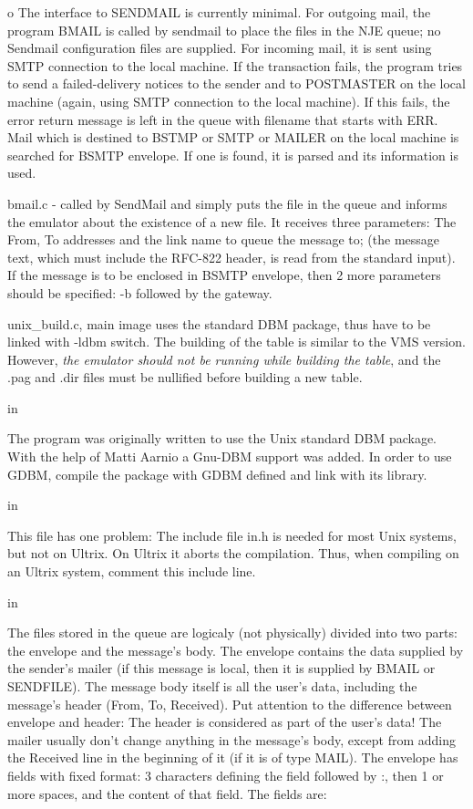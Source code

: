 {\ncrBold o}
The interface to SENDMAIL is currently minimal. For outgoing mail, the
program BMAIL is called by sendmail to place the files in the NJE queue;
no  Sendmail  configuration files are supplied. For incoming mail, it is
sent using SMTP connection to the  local  machine.  If  the  transaction
fails, the program tries to send a failed-delivery notices to the sender
and to POSTMASTER on the local machine (again, using SMTP connection  to
the  local  machine). If this fails, the error return message is left in
the queue with filename that starts with ERR. Mail which is destined  to
BSTMP  or  SMTP  or  MAILER  on  the local machine is searched for BSMTP
envelope. If one is found, it is parsed and its information is used.

{\ncrBold bmail.c}
- called by SendMail and simply puts the file in the  queue  and
informs  the  emulator  about  the  existence of a new file. It receives
three parameters: The From, To addresses and the link name to queue  the
message to; (the message text, which must include the RFC-822 header, is
read from the standard input). If the message is to be enclosed in BSMTP
envelope, then 2 more parameters should be specified: -b followed by the
gateway.

{\ncrBold unix\_build.c, main}
 image uses the standard DBM package, thus have to  be
linked with {\ncrBold -ldbm} switch. The building of the table is similar to the
VMS version. However, {\sl the emulator should not be running while  building
the table}, and the .pag and .dir files must be nullified before building
a new table.

 in

The program was originally written  to  use  the  Unix  standard  DBM
package.  With  the help of Matti Aarnio a Gnu-DBM support was added. In
order to use GDBM, compile the package with GDBM defined and  link  with
its library.

 in

This  file  has one problem: The include file {\ncrBold in.h} is needed for most
Unix systems, but not on Ultrix. On Ultrix it  aborts  the  compilation.
Thus, when compiling on an Ultrix system, comment this include line.

 in

The  files  stored in the queue are logicaly (not physically) divided
into two parts: the  envelope  and  the  message's  body.  The  envelope
contains  the  data  supplied by the sender's mailer (if this message is
local, then it is supplied by  BMAIL  or  SENDFILE).  The  message  body
itself is all the user's data, including the message's header (From, To,
Received). Put attention to the difference between envelope and  header:
The  header is considered as part of the user's data! The mailer usually
don't change anything in the message's  body,  except  from  adding  the
Received  line  in  the  beginning  of  it  (if it is of type MAIL). The
envelope has fields with fixed format: 3 characters defining  the  field
followed by :, then 1 or more spaces, and the content of that field. The
fields are:

